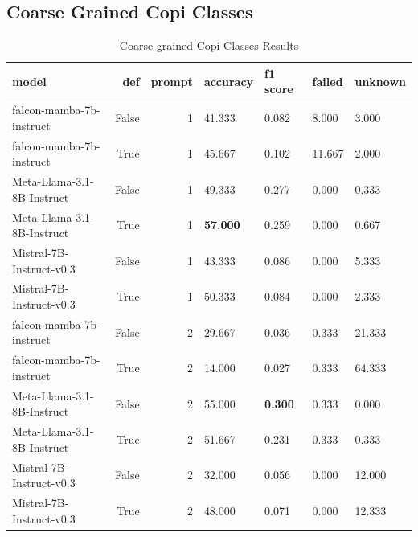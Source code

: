 \subsection{ Coarse Grained Copi Classes}
\begin{table}[H]
\centering
\caption{Coarse-grained Copi Classes Results}
\begin{tabular}{lrrllll}
\toprule
model & def & prompt & accuracy & f1 score & failed & unknown \\
\midrule
falcon-mamba-7b-instruct & False & 1 & 41.333 & 0.082 & 8.000 & 3.000 \\
falcon-mamba-7b-instruct & True & 1 & 45.667 & 0.102 & 11.667 & 2.000 \\
Meta-Llama-3.1-8B-Instruct & False & 1 & 49.333 & 0.277 & 0.000 & 0.333 \\
Meta-Llama-3.1-8B-Instruct & True & 1 & \textbf{57.000} & 0.259 & 0.000 & 0.667 \\
Mistral-7B-Instruct-v0.3 & False & 1 & 43.333 & 0.086 & 0.000 & 5.333 \\
Mistral-7B-Instruct-v0.3 & True & 1 & 50.333 & 0.084 & 0.000 & 2.333 \\
falcon-mamba-7b-instruct & False & 2 & 29.667 & 0.036 & 0.333 & 21.333 \\
falcon-mamba-7b-instruct & True & 2 & 14.000 & 0.027 & 0.333 & 64.333 \\
Meta-Llama-3.1-8B-Instruct & False & 2 & 55.000 & \textbf{0.300} & 0.333 & 0.000 \\
Meta-Llama-3.1-8B-Instruct & True & 2 & 51.667 & 0.231 & 0.333 & 0.333 \\
Mistral-7B-Instruct-v0.3 & False & 2 & 32.000 & 0.056 & 0.000 & 12.000 \\
Mistral-7B-Instruct-v0.3 & True & 2 & 48.000 & 0.071 & 0.000 & 12.333 \\
\bottomrule
\end{tabular}
\end{table}

